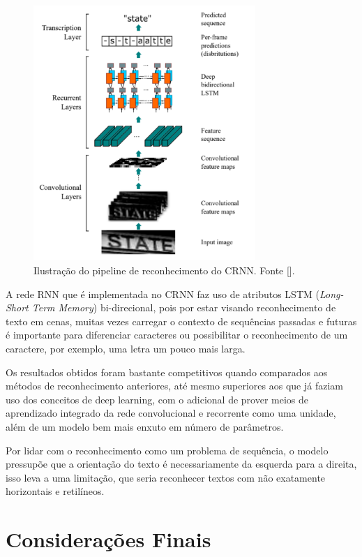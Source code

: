 \begin{figure}
    \centering
    \includegraphics[width=0.75\textwidth]{figs/crnn-pipeline.png}
    \caption{Ilustração do pipeline de reconhecimento do CRNN. Fonte [].}
    \label{fig:crnn_pipeline}
\end{figure}

A rede RNN que é implementada no CRNN faz uso de atributos LSTM (\textit{Long-Short Term Memory}) bi-direcional, pois por estar visando reconhecimento de texto em cenas, muitas vezes carregar o contexto de sequências passadas e futuras é importante para diferenciar caracteres ou possibilitar o reconhecimento de um caractere, por exemplo, uma letra um pouco mais larga.

Os resultados obtidos foram bastante competitivos quando comparados aos métodos de reconhecimento anteriores, até mesmo superiores aos que já faziam uso dos conceitos de deep learning, com o adicional de prover meios de aprendizado integrado da rede convolucional e recorrente como uma unidade, além de um modelo bem mais enxuto em número de parâmetros\cite{CRNN}.

Por lidar com o reconhecimento como um problema de sequência, o modelo pressupõe que a orientação do texto é necessariamente da esquerda para a direita, isso leva a uma limitação, que seria reconhecer textos com não exatamente horizontais e retilíneos.


\section{Considerações Finais}

\lipsum[23]
